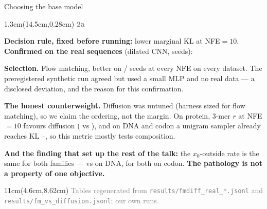 \documentclass[aspectratio=169,10pt]{beamer}
\newcommand{\lab}[1]{%
  \begin{textblock*}{1.3cm}(14.5cm,0.28cm)
    \raggedleft\bfseries\small\textcolor{gray}{#1}
  \end{textblock*}}
\newcommand{\srcs}[1]{%
  \begin{textblock*}{11cm}(4.6cm,8.62cm)
    \raggedleft\fontsize{4.8}{5.6}\selectfont\textcolor{gray}{#1}
  \end{textblock*}}
\begin{document}

\begin{frame}{Choosing the base model}
\lab{2a}
\textbf{Decision rule, fixed before running:} lower marginal KL at NFE${=}10$.
\textbf{Confirmed on the real sequences} (dilated CNN, \RealSeeds{} seeds):
\begin{center}\tiny\resizebox{\linewidth}{!}{}\end{center}

\textbf{Selection.} Flow matching, better on \RealMinWins/\RealSeeds{} seeds at every NFE on
every dataset. The preregistered synthetic run agreed but used a small MLP and no real
data --- a disclosed deviation, and the reason for this confirmation.

\medskip
\textbf{The honest counterweight.} Diffusion was untuned (harness sized for flow matching), so
we claim the ordering, not the margin. On protein, 3-mer $r$ at NFE${=}10$ favours diffusion
(\RealProtKmerDiff{} vs \RealProtKmerFM), and on DNA and codon a unigram sampler already reaches
KL \UniKLDNA--\UniKLCodon, so this metric mostly tests composition.

\medskip
\textbf{And the finding that set up the rest of the talk:} the $x_0$-outside rate is the same
for both families --- \RealXDnaFM{} vs \RealXDnaDiff{} on DNA, \RealXCodonFM{} for both on
codon. \textbf{The pathology is not a property of one objective.}
\srcs{Tables regenerated from \texttt{results/fmdiff\_real\_*.jsonl} and
\texttt{results/fm\_vs\_diffusion.jsonl}; our own runs.}
\end{frame}
\end{document}
